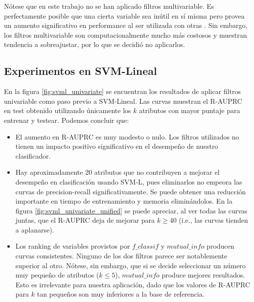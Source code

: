 Nótese que en este trabajo no se han aplicado filtros multivariable. Es perfectamente posible que una cierta variable sea inútil en sí misma pero provea un aumento significativo en performance al ser utilizada con otras \cite{fs3}. Sin embargo, los filtros multivariable son computacionalmente mucho más costosos y muestran tendencia a sobreajustar, por lo que se decidió no aplicarlos. 

\subsection{Experimentos en SVM-Lineal}

En la figura \ref{fig:svml_univariate} se encuentran los resultados de aplicar filtros univariable como paso previo a SVM-Lineal. Las curvas muestran el R-AUPRC en test obtenido utilizando únicamente los $k$ atributos con mayor puntaje para entrenar y testear. Podemos concluir que:

\begin{itemize}
\item El aumento en R-AUPRC es muy modesto o nulo. Los filtros utilizados no tienen un impacto positivo significativo en el desempeño de nuestro clasificador.
\item Hay aproximadamente 20 atributos que no contribuyen a mejorar el desempeño en clasificación usando SVM-L, pues eliminarlos no empeora las curvas de precision-recall significativamente. Se puede obtener una reducción importante en tiempo de entrenamiento y memoria eliminándolos. En la figura \ref{fig:svml_univariate_unified} se puede apreciar, al ver todas las curvas juntas, que el R-AUPRC deja de mejorar para $k\geq40$ (i.e., las curvas tienden a aplanarse).
\item Los ranking de variables provistos por $f\_classif$ y $mutual\_info$ producen curvas consistentes. Ninguno de los dos filtros parece ser notablemente superior al otro. Nótese, sin embargo, que si se decide seleccionar un número muy pequeño de atributos ($k\leq5$), $mutual\_info$ produce mejores resultados. Esto es irrelevante para nuestra aplicación, dado que los valores de R-AUPRC para $k$ tan pequeños son muy inferiores a la base de referencia.
\end{itemize}

